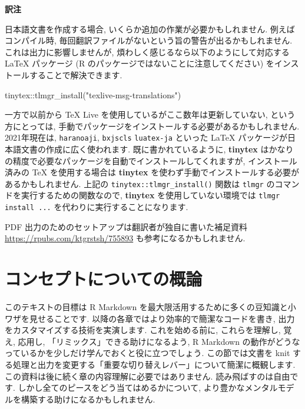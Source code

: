 \documentclass[
  11pt,
  lualatex,ja=standard,jafont=noto]{bxjsreport}
\newenvironment{Shaded}{\begin{snugshade}}{\end{snugshade}}
\newcommand{\FunctionTok}[1]{\textcolor[rgb]{0.00,0.00,0.00}{#1}}
\newcommand{\NormalTok}[1]{#1}
\newcommand{\SpecialCharTok}[1]{\textcolor[rgb]{0.00,0.00,0.00}{#1}}
\newcommand{\StringTok}[1]{\textcolor[rgb]{0.31,0.60,0.02}{#1}}
\newenvironment{infobox}[1]{\begin{itemize}\renewcommand{\labelitemi}{\raisebox{-.7\height}[0pt][0pt]{%
  {\setkeys{Gin}{width=3em,keepaspectratio}\texttt{[image: \_latex/\_img/\#1]}}}}
  \setlength{\fboxsep}{1em}
  \begin{greyblock}
  \item
  }{\end{greyblock}\end{itemize}
}
\begin{document}
\begin{infobox}{memo}
\textbf{訳注}

日本語文書を作成する場合, いくらか追加の作業が必要かもしれません. 例えばコンパイル時, 毎回翻訳ファイルがないという旨の警告が出るかもしれません. これは出力に影響しませんが, 煩わしく感じるなら以下のようにして対応する LaTeX パッケージ (R のパッケージではないことに注意してください) をインストールすることで解決できます.

\begin{Shaded}
\begin{Highlighting}[]
\NormalTok{tinytex}\SpecialCharTok{::}\FunctionTok{tlmgr\_install}\NormalTok{(}\StringTok{"texlive{-}msg{-}translations"}\NormalTok{)}
\end{Highlighting}
\end{Shaded}

一方で以前から TeX Live を使用しているがここ数年は更新していない, という方にとっては, 手動でパッケージをインストールする必要があるかもしれません. 2021年現在は, \texttt{haranoaji}, \texttt{bxjscls} \texttt{luatex-ja} といった LaTeX パッケージが日本語文書の作成に広く使われます. 既に書かれているように, \textbf{tinytex} はかなりの精度で必要なパッケージを自動でインストールしてくれますが, インストール済みの TeX を使用する場合は \textbf{tinytex} を使わず手動でインストールする必要があるかもしれません. 上記の \texttt{tinytex::tlmgr\_install()} 関数は \texttt{tlmgr} のコマンドを実行するための関数なので, \textbf{tinytex} を使用していない環境では \texttt{tlmgr install ...} を代わりに実行することになります.

PDF 出力のためのセットアップは翻訳者が独自に書いた補足資料 \url{https://rpubs.com/ktgrstsh/755893} も参考になるかもしれません.

\end{infobox}

\hypertarget{conceptual-overview}{%
\chapter{コンセプトについての概論}\label{conceptual-overview}}

このテキストの目標は R Markdown を最大限活用するために多くの豆知識と小ワザを見せることです. 以降の各章ではより効率的で簡潔なコードを書き, 出力をカスタマイズする技術を実演します. これを始める前に, これらを理解し, 覚え, 応用し, 「リミックス」できる助けになるよう, R Markdown の動作がどうなっているかを少しだけ学んでおくと役に立つでしょう. この節では文書を knit する処理と出力を変更する「重要な切り替えレバー」について簡潔に概観します. この資料は後に続く章の内容理解に必要ではありません. 読み飛ばすのは自由です. しかし全てのピースをどう当てはめるかについて, より豊かなメンタルモデルを構築する助けになるかもしれません.
\end{document}
